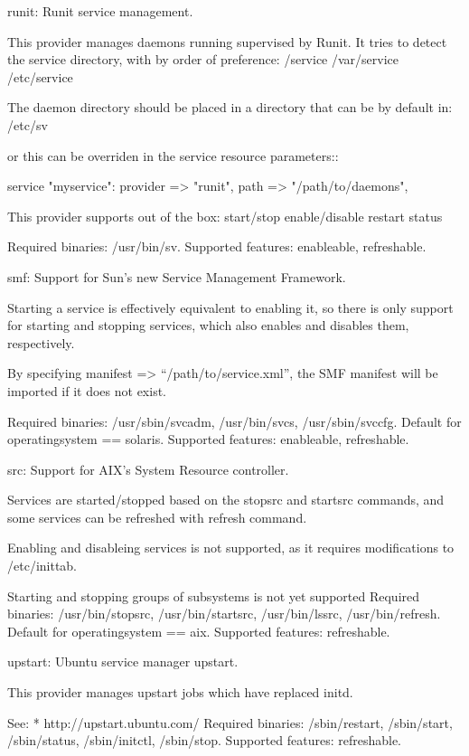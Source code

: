     runit: Runit service management.

    This provider manages daemons running supervised by Runit. It tries to detect the service directory, with by order of preference:
        /service
        /var/service
        /etc/service

    The daemon directory should be placed in a directory that can be by default in:
        /etc/sv

    or this can be overriden in the service resource parameters::

    service { "myservice": provider => "runit", path => "/path/to/daemons",
    }

    This provider supports out of the box:
        start/stop
        enable/disable
        restart
        status

    Required binaries: /usr/bin/sv. Supported features: enableable, refreshable.

    smf: Support for Sun’s new Service Management Framework.

    Starting a service is effectively equivalent to enabling it, so there is only support for starting and stopping services, which also enables and disables them, respectively.

    By specifying manifest => “/path/to/service.xml”, the SMF manifest will be imported if it does not exist.

    Required binaries: /usr/sbin/svcadm, /usr/bin/svcs, /usr/sbin/svccfg. Default for operatingsystem == solaris. Supported features: enableable, refreshable.

    src: Support for AIX’s System Resource controller.

    Services are started/stopped based on the stopsrc and startsrc commands, and some services can be refreshed with refresh command.

        Enabling and disableing services is not supported, as it requires modifications to /etc/inittab.

        Starting and stopping groups of subsystems is not yet supported Required binaries: /usr/bin/stopsrc, /usr/bin/startsrc, /usr/bin/lssrc, /usr/bin/refresh. Default for operatingsystem == aix. Supported features: refreshable.

    upstart: Ubuntu service manager upstart.

    This provider manages upstart jobs which have replaced initd.

    See: * http://upstart.ubuntu.com/ Required binaries: /sbin/restart, /sbin/start, /sbin/status, /sbin/initctl, /sbin/stop. Supported features: refreshable.

